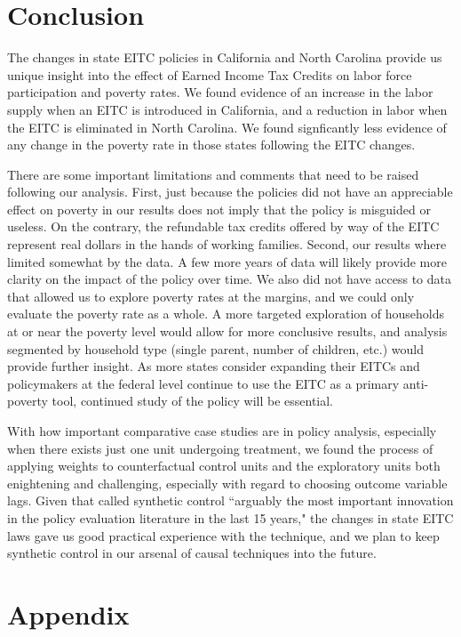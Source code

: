 \documentclass{article}
\newcommand*\InputTable[1]{}
\begin{document}
\section{Conclusion}

The changes in state EITC policies in California and North Carolina provide us unique insight into the effect of Earned Income Tax Credits on labor force participation and poverty rates. We found evidence of an increase in the labor supply when an EITC is introduced in California, and a reduction in labor when the EITC is eliminated in North Carolina. We found signficantly less evidence of any change in the poverty rate in those states following the EITC changes. 

There are some important limitations and comments that need to be raised following our analysis. First, just because the policies did not have an appreciable effect on poverty in our results does not imply that the policy is misguided or useless. On the contrary, the refundable tax credits offered by way of the EITC represent real dollars in the hands of working families. Second, our results where limited somewhat by the data. A few more years of data will likely provide more clarity on the impact of the policy over time. We also did not have access to data that allowed us to explore poverty rates at the margins, and we could only evaluate the poverty rate as a whole. A more targeted exploration of households at or near the poverty level would allow for more conclusive results, and analysis segmented by household type (single parent, number of children, etc.) would provide further insight. As more states consider expanding their EITCs and policymakers at the federal level continue to use the EITC as a primary anti-poverty tool, continued study of the policy will be essential. 

With how important comparative case studies are in policy analysis, especially when there exists just one unit undergoing treatment, we found the process of applying weights to counterfactual control units and the exploratory units both enightening and challenging, especially with regard to choosing outcome variable lags. Given that \cite{athey2017state} called synthetic control ``arguably the most important innovation in the policy evaluation literature in the last 15 years," the changes in state EITC laws gave us good practical experience with the technique, and we plan to keep synthetic control in our arsenal of causal techniques into the future.  

{}


\newpage
\section*{Appendix}

\InputTable{summarystats}
\InputTable{ca_lab}
\InputTable{ca_pov}
\InputTable{nc_lab}
\InputTable{nc_pov}
\end{document}
